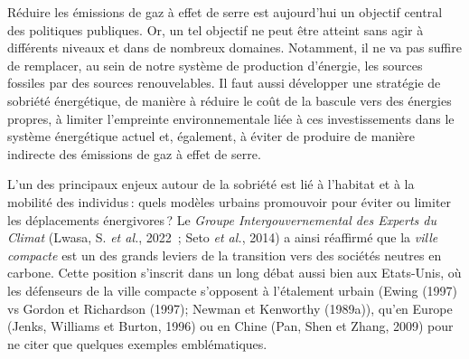 \documentclass[
  9pt,
  a4paper,
  DIV=11]{scrreprt}
\begin{document}
Réduire les émissions de gaz à effet de serre est aujourd'hui un
objectif central des politiques publiques. Or, un tel objectif ne peut
être atteint sans agir à différents niveaux et dans de nombreux
domaines. Notamment, il ne va pas suffire de remplacer, au sein de notre
système de production d'énergie, les sources fossiles par des sources
renouvelables. Il faut aussi développer une stratégie de sobriété
énergétique, de manière à réduire le coût de la bascule vers des
énergies propres, à limiter l'empreinte environnementale liée à ces
investissements dans le système énergétique actuel et, également, à
éviter de produire de manière indirecte des émissions de gaz à effet de
serre.

L'un des principaux enjeux autour de la sobriété est lié à l'habitat et
à la mobilité des individus\,: quels modèles urbains promouvoir pour
éviter ou limiter les déplacements énergivores\,? Le \emph{Groupe
Intergouvernemental des Experts du Climat} (Lwasa, S. \emph{et al.},
2022~; Seto \emph{et al.}, 2014) a ainsi réaffirmé que la \emph{ville
compacte} est un des grands leviers de la transition vers des sociétés
neutres en carbone. Cette position s'inscrit dans un long débat aussi
bien aux Etats-Unis, où les défenseurs de la ville compacte s'opposent à
l'étalement urbain (Ewing (1997) vs Gordon et Richardson (1997); Newman
et Kenworthy (1989a)), qu'en Europe (Jenks, Williams et Burton, 1996) ou
en Chine (Pan, Shen et Zhang, 2009) pour ne citer que quelques exemples
emblématiques.
\end{document}
